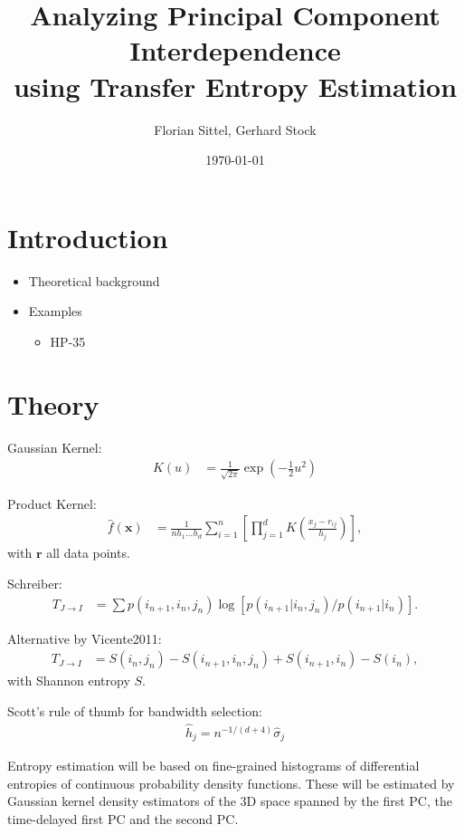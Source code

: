 \documentclass[12pt,a4paper,twoside,english,fleqn,preprint,aps,prb]{revtex4}
\newcommand{\rr}{\mathbf{r}}
\newcommand{\xx}{\mathbf{x}}
\begin{document}
\author{Florian Sittel, Gerhard Stock} 
\title{Analyzing Principal Component Interdependence\\ using Transfer Entropy Estimation}
\date{\today}

\begingroup
 \let\clearpage\relax
 \maketitle
\endgroup

\tableofcontents
\clearpage


\section{Introduction}
\begin{itemize}
  \item Theoretical background
  \item Examples
        \begin{itemize}
          \item HP-35
        \end{itemize}
\end{itemize}


\section{Theory}

Gaussian Kernel:
\begin{align}
  K(u) &= \frac{1}{\sqrt{2\pi}} \exp(-\frac{1}{2} u^2)
\end{align}

Product Kernel:
\begin{align}
  \hat{f}(\xx) &= \frac{1}{n h_1 \dots h_d} \sum_{i=1}^{n}\left[ \prod_{j=1}^{d} K\left(\frac{x_j - r_{ij}}{h_j} \right)\right],
\end{align}
with $\rr$ all data points.

Schreiber:
\begin{align}
  T_{J \rightarrow I} &= \sum p(i_{n+1}, i_n, j_n) \log \left[p(i_{n+1} \vert i_n, j_n) / p(i_{n+1} \vert i_n) \right].
\end{align}

Alternative by Vicente2011:
\begin{align}
  T_{J \rightarrow I} &= S(i_n, j_n) - S(i_{n+1}, i_n, j_n) + S(i_{n+1}, i_n) - S(i_n),
\end{align}
with Shannon entropy $S$.

Scott's rule of thumb for bandwidth selection:
\begin{align}
  \hat{h}_j = n^{-1/(d+4)} \hat{\sigma}_j
\end{align}

Entropy estimation will be based on fine-grained histograms of differential entropies of continuous probability density functions.
These will be estimated by Gaussian kernel density estimators of the 3D space spanned by the first PC, the time-delayed first PC
and the second PC.




\end{document}
